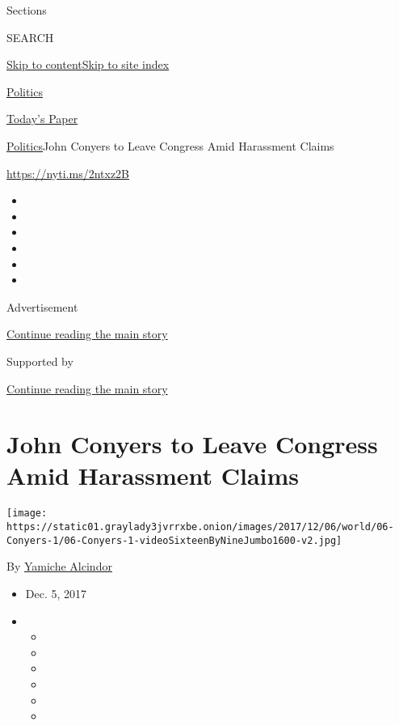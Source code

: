 Sections

SEARCH

\protect\hyperlink{site-content}{Skip to
content}\protect\hyperlink{site-index}{Skip to site index}

\href{https://www.nytimes3xbfgragh.onion/section/politics}{Politics}

\href{https://myaccount.nytimes3xbfgragh.onion/auth/login?response_type=cookie\&client_id=vi}{}

\href{https://www.nytimes3xbfgragh.onion/section/todayspaper}{Today's
Paper}

\href{/section/politics}{Politics}\textbar{}John Conyers to Leave
Congress Amid Harassment Claims

\url{https://nyti.ms/2ntxz2B}

\begin{itemize}
\item
\item
\item
\item
\item
\item
\end{itemize}

Advertisement

\protect\hyperlink{after-top}{Continue reading the main story}

Supported by

\protect\hyperlink{after-sponsor}{Continue reading the main story}

\hypertarget{john-conyers-to-leave-congress-amid-harassment-claims}{%
\section{John Conyers to Leave Congress Amid Harassment
Claims}\label{john-conyers-to-leave-congress-amid-harassment-claims}}

\texttt{[image: https://static01.graylady3jvrrxbe.onion/images/2017/12/06/world/06-Conyers-1/06-Conyers-1-videoSixteenByNineJumbo1600-v2.jpg]}

By \href{http://www.nytimes3xbfgragh.onion/by/yamiche-alcindor}{Yamiche
Alcindor}

\begin{itemize}
\item
  Dec. 5, 2017
\item
  \begin{itemize}
  \item
  \item
  \item
  \item
  \item
  \item
  \end{itemize}
\end{itemize}


